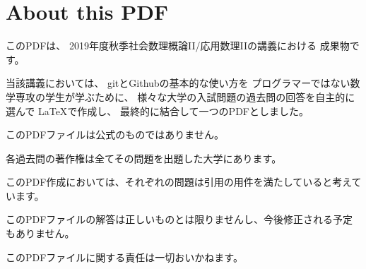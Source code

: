 \documentclass[main]{subfiles}
\begin{document}
\section*{About this PDF}
このPDFは、
2019年度秋季社会数理概論II/応用数理IIの講義における
成果物です。

当該講義においては、
gitとGithubの基本的な使い方を
プログラマーではない数学専攻の学生が学ぶために、
様々な大学の入試問題の過去問の回答を自主的に選んで
\LaTeX で作成し、
最終的に結合して一つのPDFとしました。

このPDFファイルは公式のものではありません。

各過去問の著作権は全てその問題を出題した大学にあります。

このPDF作成においては、それぞれの問題は引用の用件を満たしていると考えています。

このPDFファイルの解答は正しいものとは限りませんし、今後修正される予定もありません。

このPDFファイルに関する責任は一切おいかねます。
\end{document}
